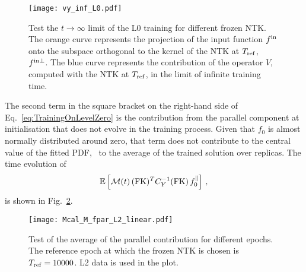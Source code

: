 \begin{figure}[t]
  \centering
  \texttt{[image: vy\_inf\_L0.pdf]}  
  \caption{Test the $t\to\infty$ limit of the L0 training for different frozen
  NTK. The orange curve represents the projection of the input function $f^{\rm in}$
  onto the subspace orthogonal to the kernel of the NTK at $T_{\rm ref}$, \ie\
  $f^{\rm in \perp}$. The blue curve represents the contribution of the operator $V$,
  computed with the NTK at $T_{\rm ref}$, in the limit of infinite training
  time.}
  \label{fig:InfiniteTimeVterm}
\end{figure}

The second term in the square bracket on the right-hand side of
Eq.~\eqref{eq:TrainingOnLevelZero} is the contribution from the parallel
component at initialisation that does not evolve in the training process. Given
that $f_0$ is almost normally distributed around zero, that term does not
contribute to the central value of the fitted PDF, \ie\ to the average of the
trained solution over replicas. The time evolution of 
\begin{align}
  \label{eq:AverageLevelZeroUcheck}
  \mathbb{E}\left[\mathcal{M}(t)\, (\mathrm{FK})^T C_{Y}^{-1} (\mathrm{FK})\, 
    f_{0}^\parallel\right]\, ,
\end{align}
is shown in Fig.~\ref{fig:AverageLevelZeroUcheck}.
\begin{figure}[h!]
  \centering
  \texttt{[image: Mcal\_M\_fpar\_L2\_linear.pdf]} 
  \caption{Test of the average of the parallel contribution for different
  epochs. The reference epoch at which the frozen NTK is chosen is $T_{\rm ref}
  = 10000$. L2 data is used in the plot.}
  \label{fig:AverageLevelZeroUcheck}
\end{figure}

